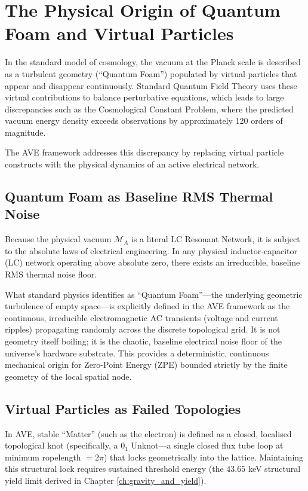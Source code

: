 \section{The Physical Origin of Quantum Foam and Virtual Particles}
In the standard model of cosmology, the vacuum at the Planck scale is described as a turbulent geometry (``Quantum Foam'') populated by virtual particles that appear and disappear continuously. Standard Quantum Field Theory uses these virtual contributions to balance perturbative equations, which leads to large discrepancies such as the Cosmological Constant Problem, where the predicted vacuum energy density exceeds observations by approximately 120 orders of magnitude.

The AVE framework addresses this discrepancy by replacing virtual particle constructs with the physical dynamics of an active electrical network.

\subsection{Quantum Foam as Baseline RMS Thermal Noise}
Because the physical vacuum $\mathcal{M}_A$ is a literal LC Resonant Network, it is subject to the absolute laws of electrical engineering. In any physical inductor-capacitor (LC) network operating above absolute zero, there exists an irreducible, baseline RMS thermal noise floor. 

What standard physics identifies as ``Quantum Foam''---the underlying geometric turbulence of empty space---is explicitly defined in the AVE framework as the continuous, irreducible electromagnetic AC transients (voltage and current ripples) propagating randomly across the discrete topological grid. It is not geometry itself boiling; it is the chaotic, baseline electrical noise floor of the universe's hardware substrate. This provides a deterministic, continuous mechanical origin for Zero-Point Energy (ZPE) bounded strictly by the finite geometry of the local spatial node.

\subsection{Virtual Particles as Failed Topologies}
In AVE, stable ``Matter'' (such as the electron) is defined as a closed, localised topological knot (specifically, a $0_1$ Unknot---a single closed flux tube loop at minimum ropelength $= 2\pi$) that locks geometrically into the lattice. Maintaining this structural lock requires sustained threshold energy (the $43.65$ keV structural yield limit derived in Chapter \ref{ch:gravity_and_yield}).


